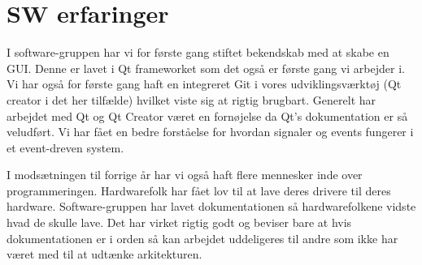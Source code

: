 \section{SW erfaringer}

I software-gruppen har vi for første gang stiftet bekendskab med at skabe en GUI. Denne er lavet i Qt frameworket som det også er første gang vi arbejder i. Vi har også for første gang haft en integreret Git i vores udviklingsværktøj (Qt creator i det her tilfælde) hvilket viste sig at rigtig brugbart. Generelt har arbejdet med Qt og Qt Creator været en fornøjelse da Qt's dokumentation er så veludført. Vi har fået en bedre forståelse for hvordan signaler og events fungerer i et event-dreven system.

I modsætningen til forrige år har vi også haft flere mennesker inde over programmeringen. Hardwarefolk har fået lov til at lave deres drivere til deres hardware. Software-gruppen har lavet dokumentationen så hardwarefolkene vidste hvad de skulle lave. Det har virket rigtig godt og beviser bare at hvis dokumentationen er i orden så kan arbejdet uddeligeres til andre som ikke har været med til at udtænke arkitekturen.